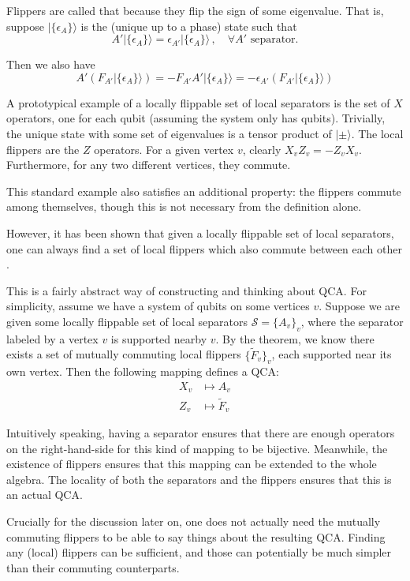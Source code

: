 \documentclass[aps,twocolumn,prx,floatfix,preprintnumbers, nofootinbib,10pt]{revtex4-2}
\numberwithin{equation}{section}
\theoremstyle{definition}
\theoremstyle{remark}
\theoremstyle{claim}
\newcommand{\be}{\begin{equation}}
\newcommand{\ee}{\end{equation}}
\def\ket#1{{|{#1}\rangle}}
\newcommand{\mc}[1]{\mathcal{#1}}
\newcommand{\paren}[1]{\left( #1 \right)}
\begin{document}
Flippers are called that because they flip the sign of some eigenvalue. That is, suppose $\ket{\{\epsilon_A\}}$ is the (unique up to a phase) state such that
\be
A' \ket{\{\epsilon_A\}} = \epsilon_{A'} \ket{\{\epsilon_A\}} \,, \quad \forall A' \text{ separator.}
\ee

Then we also have
\be
A' \paren{F_{A'} \ket{\{\epsilon_A\}}} = - F_{A'} A' \ket{\{\epsilon_A\}} = - \epsilon_{A'} \paren{F_{A'} \ket{\{\epsilon_A\}}}
\ee

A prototypical example of a locally flippable set of local separators is the set of $X$ operators, one for each qubit (assuming the system only has qubits). Trivially, the unique state with some set of eigenvalues is a tensor product of $\ket{\pm}$. The local flippers are the $Z$ operators. For a given vertex $v$, clearly $X_v Z_v = - Z_v X_v$. Furthermore, for any two different vertices, they commute.

This standard example also satisfies an additional property: the flippers commute among themselves, though this is not necessary from the definition alone.

However, it has been shown that given a locally flippable set of local separators, one can always find a set of local flippers which also commute between each other \cite{HaahFidkowskiHastings2023}.

This is a fairly abstract way of constructing and thinking about QCA. For simplicity, assume we have a system of qubits on some vertices $v$. Suppose we are given some locally flippable set of local separators $\mc{S} = \{A_v\}_v$, where the separator labeled by a vertex $v$ is supported nearby $v$. By the theorem, we know there exists a set of mutually commuting local flippers $\{\tilde{F}_v \}_v$, each supported near its own vertex. Then the following mapping defines a QCA:
\begin{align}
 X_v &\longmapsto A_v \\
 Z_v &\longmapsto \tilde{F}_v
\end{align}

Intuitively speaking, having a separator ensures that there are enough operators on the right-hand-side for this kind of mapping to be bijective. Meanwhile, the existence of flippers ensures that this mapping can be extended to the whole algebra. The locality of both the separators and the flippers ensures that this is an actual QCA.

Crucially for the discussion later on, one does not actually need the mutually commuting flippers to be able to say things about the resulting QCA. Finding any (local) flippers can be sufficient, and those can potentially be much simpler than their commuting counterparts.
\end{document}
